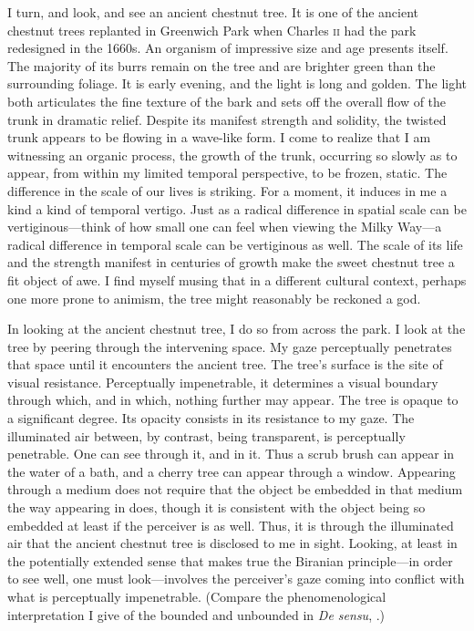 I turn, and look, and see an ancient chestnut tree. It is one of the ancient chestnut trees replanted in Greenwich Park when Charles \textsc{ii} had the park redesigned in the 1660s. An organism of impressive size and age presents itself. The majority of its burrs remain on the tree and are brighter green than the surrounding foliage. It is early evening, and the light is long and golden. The light both articulates the fine texture of the bark and sets off the overall flow of the trunk in dramatic relief. Despite its manifest strength and solidity, the twisted trunk appears to be flowing in a wave-like form. I come to realize that I am witnessing an organic process, the growth of the trunk, occurring so slowly as to appear, from within my limited temporal perspective, to be frozen, static. The difference in the scale of our lives is striking. For a moment, it induces in me a kind a kind of temporal vertigo.  Just as a radical difference in spatial scale can be vertiginous---think of how small one can feel when viewing the Milky Way---a radical difference in temporal scale can be vertiginous as well. The scale of its life and the strength manifest in centuries of growth make the sweet chestnut tree a fit object of awe. I find myself musing that in a different cultural context, perhaps one more prone to animism, the tree might reasonably be reckoned a god. 

In looking at the ancient chestnut tree, I do so from across the park. I look at the tree by peering through the intervening space. My gaze perceptually penetrates that space until it encounters the ancient tree. The tree's surface is the site of visual resistance. Perceptually impenetrable, it determines a visual boundary through which, and in which, nothing further may appear. The tree is opaque to a significant degree. Its opacity consists in its resistance to my gaze. The illuminated air between, by contrast, being transparent, is perceptually penetrable. One can see through it, and in it. Thus a scrub brush can appear in the water of a bath, and a cherry tree can appear through a window. Appearing through a medium does not require that the object be embedded in that medium the way appearing in does, though it is consistent with the object being so embedded at least if the perceiver is as well. Thus, it is through the illuminated air that the ancient chestnut tree is disclosed to me in sight. Looking, at least in the potentially extended sense that makes true the Biranian principle---in order to see well, one must look---involves the perceiver's gaze coming into conflict with what is perceptually impenetrable. (Compare the phenomenological interpretation I give of the bounded and unbounded in \emph{De sensu}, \citealt[chapter 3.3]{Kalderon:2015fr}.)

